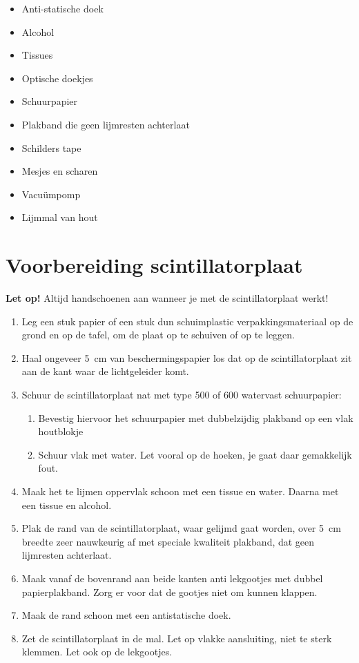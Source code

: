 \begin{itemize}
    \item Anti-statische doek
    \item Alcohol
    \item Tissues
    \item Optische doekjes
    \item Schuurpapier
    \item Plakband die geen lijmresten achterlaat
    \item Schilders tape
    \item Mesjes en scharen
    \item Vacuümpomp
    \item Lijmmal van hout
\end{itemize}


\section{Voorbereiding scintillatorplaat}

\textbf{Let op!} Altijd handschoenen aan wanneer je met de
scintillatorplaat werkt!

\begin{enumerate}
    \item Leg een stuk papier of een stuk dun schuimplastic
    verpakkingsmateriaal op de grond en op de tafel, om de plaat op te
    schuiven of op te leggen.
    \item Haal ongeveer \SI{5}{\centi\meter} van beschermingspapier los
    dat op de scintillatorplaat zit aan de kant waar de lichtgeleider
    komt.
    \item Schuur de scintillatorplaat nat met type 500 of 600 watervast
    schuurpapier:
    \begin{enumerate}
        \item Bevestig hiervoor het schuurpapier met dubbelzijdig
        plakband op een vlak houtblokje
        \item Schuur vlak met water. Let vooral op de hoeken, je gaat
        daar gemakkelijk fout.
    \end{enumerate}
    \item Maak het te lijmen oppervlak schoon met een tissue en water.
    Daarna met een tissue en alcohol.
    \item Plak de rand van de scintillatorplaat, waar gelijmd gaat
    worden, over \SI{5}{\centi\meter} breedte zeer nauwkeurig af met
    speciale kwaliteit plakband, dat geen lijmresten achterlaat.
    \item Maak vanaf de bovenrand aan beide kanten anti lekgootjes met
    dubbel papierplakband. Zorg er voor dat de gootjes niet om kunnen
    klappen.
    \item Maak de rand schoon met een antistatische doek.
    \item Zet de scintillatorplaat in de mal. Let op vlakke aansluiting,
    niet te sterk klemmen. Let ook op de lekgootjes.
\end{enumerate}


